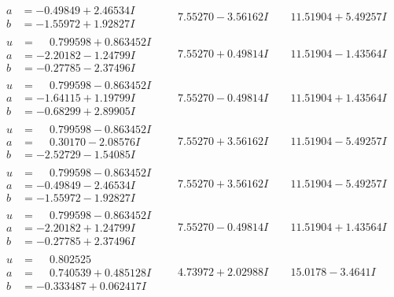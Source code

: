 \documentclass[1p]{elsarticle_modified}
\theoremstyle{definition}
\begin{document}
$$\begin{array}{c|c|c}
\begin{aligned}
a &= -0.49849 + 2.46534 I \\
b &= -1.55972 + 1.92827 I\end{aligned}
 & \phantom{-}7.55270 - 3.56162 I & \phantom{-}11.51904 + 5.49257 I \\ \hline\begin{aligned}
u &= \phantom{-}0.799598 + 0.863452 I \\
a &= -2.20182 - 1.24799 I \\
b &= -0.27785 - 2.37496 I\end{aligned}
 & \phantom{-}7.55270 + 0.49814 I & \phantom{-}11.51904 - 1.43564 I \\ \hline\begin{aligned}
u &= \phantom{-}0.799598 - 0.863452 I \\
a &= -1.64115 + 1.19799 I \\
b &= -0.68299 + 2.89905 I\end{aligned}
 & \phantom{-}7.55270 - 0.49814 I & \phantom{-}11.51904 + 1.43564 I \\ \hline\begin{aligned}
u &= \phantom{-}0.799598 - 0.863452 I \\
a &= \phantom{-}0.30170 - 2.08576 I \\
b &= -2.52729 - 1.54085 I\end{aligned}
 & \phantom{-}7.55270 + 3.56162 I & \phantom{-}11.51904 - 5.49257 I \\ \hline\begin{aligned}
u &= \phantom{-}0.799598 - 0.863452 I \\
a &= -0.49849 - 2.46534 I \\
b &= -1.55972 - 1.92827 I\end{aligned}
 & \phantom{-}7.55270 + 3.56162 I & \phantom{-}11.51904 - 5.49257 I \\ \hline\begin{aligned}
u &= \phantom{-}0.799598 - 0.863452 I \\
a &= -2.20182 + 1.24799 I \\
b &= -0.27785 + 2.37496 I\end{aligned}
 & \phantom{-}7.55270 - 0.49814 I & \phantom{-}11.51904 + 1.43564 I \\ \hline\begin{aligned}
u &= \phantom{-}0.802525\phantom{ +0.000000I} \\
a &= \phantom{-}0.740539 + 0.485128 I \\
b &= -0.333487 + 0.062417 I\end{aligned}
 & \phantom{-}4.73972 + 2.02988 I & \phantom{-}15.0178 - 3.4641 I \\ \hline\begin{aligned}

\end{aligned}
\end{array}$$
\end{document}
